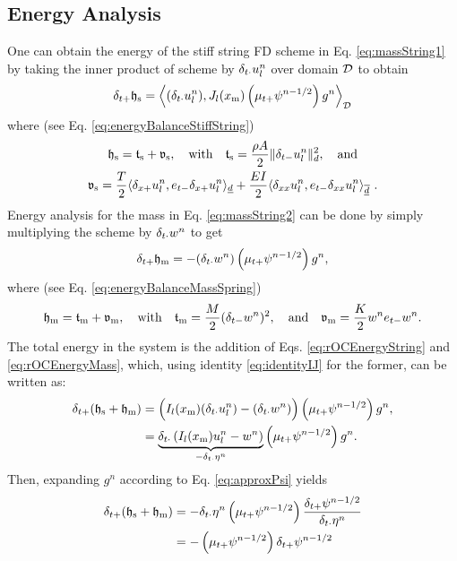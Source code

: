 \subsection{Energy Analysis}
One can obtain the energy of the stiff string FD scheme in Eq. \eqref{eq:massString1} by taking the inner product of scheme by $\delta_{t\cdot} u_l^n$ over domain $\mathcal{D}$ to obtain 
\begin{equation}\label{eq:rOCEnergyString}
    \delta_{t+} \mathfrak{h}_\text{s} = \left\langle (\delta_{t\cdot} u_l^n), J_l(x_\text{m})\left(\mu_{t+} \psi^{n-1/2}\right)g^n\right\rangle_{\mathcal{D}}
\end{equation}
where (see Eq. \eqref{eq:energyBalanceStiffString})
\begin{equation*}
    \begin{gathered}
        \mathfrak{h}_\text{s} = \mathfrak{t}_\text{s} + \mathfrak{v}_\text{s}, \quad \text{with} \quad \mathfrak{t}_\text{s} = \frac{\rho A}{2}\lVert\delta_{t-} u_l^n\rVert^2_d,\quad \text{and} \\
        \mathfrak{v}_\text{s} = \frac{T}{2}\langle\delta_{x+}u_l^n, e_{t-}\delta_{x+}u_l^n\rangle_{\underline{d}} + \frac{EI}{2}\langle\delta_{xx}u_l^n, e_{t-}\delta_{xx}u_l^n\rangle_{\overline{\underline{d}}}\ .
    \end{gathered}
\end{equation*}
Energy analysis for the mass in Eq. \eqref{eq:massString2} can be done by simply multiplying the scheme by $\delta_{t\cdot} w^n$ to get 
\begin{equation}\label{eq:rOCEnergyMass}
    \delta_{t+} \mathfrak{h}_\text{m} = -(\delta_{t\cdot} w^n)\left(\mu_{t+} \psi^{n-1/2}\right)g^n,
\end{equation}
where (see Eq. \eqref{eq:energyBalanceMassSpring})
\begin{equation*}
    \mathfrak{h}_\text{m} = \mathfrak{t}_\text{m} + \mathfrak{v}_\text{m}, \quad \text{with} \quad \mathfrak{t}_\text{m} = \frac{M}{2}(\delta_{t-} w^n)^2, \quad \text{and} \quad \mathfrak{v}_\text{m} = \frac{K}{2}w^n e_{t-}w^n.
\end{equation*}
The total energy in the system is the addition of Eqs. \eqref{eq:rOCEnergyString} and \eqref{eq:rOCEnergyMass}, which, using identity \eqref{eq:identityIJ} for the former, can be written as:
\begin{align*}
    \delta_{t+}(\mathfrak{h}_\text{s} + \mathfrak{h}_\text{m}) &= \Big(I_l(x_\text{m})(\delta_{t\cdot} u_l^n) - (\delta_{t\cdot} w^n)\Big)\left(\mu_{t+} \psi^{n-1/2}\right)g^n,\\
    &= \underbrace{\delta_{t\cdot}\left(I_l(x_\text{m})u_l^n - w^n\right)}_{-\delta_{t\cdot} \eta^n}\left(\mu_{t+} \psi^{n-1/2}\right)g^n.
\end{align*}
Then, expanding $g^n$ according to Eq. \eqref{eq:approxPsi} yields 
\begin{align*}
    \delta_{t+}(\mathfrak{h}_\text{s} + \mathfrak{h}_\text{m}) &= - \delta_{t\cdot}\eta^n\left(\mu_{t+} \psi^{n-1/2}\right)\frac{\delta_{t+}\psi^{n-1/2}}{\delta_{t\cdot}\eta^n}\\
    &= -\left(\mu_{t+} \psi^{n-1/2}\right)\delta_{t+}\psi^{n-1/2}
\end{align*}
